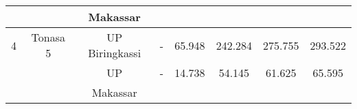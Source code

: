 \documentclass{article}
\begin{document}
\begin{table}[h]
\begin{tabular}{|r|c|c|c|c|c|c|c|}
		\hline
		\multicolumn{ 1}{|r|}{} & \multicolumn{ 1}{|c|}{} &   Makassar & \multicolumn{ 1}{|c|}{} & \multicolumn{ 1}{|c|}{} & \multicolumn{ 1}{|c|}{} & \multicolumn{ 1}{|c|}{} & \multicolumn{ 1}{|c|}{} \\
		\hline
		\multicolumn{ 1}{|r|}{4} & \multicolumn{ 1}{|c|}{Tonasa 5} & UP Biringkassi &          - &     65.948 &    242.284 &    275.755 &    293.522 \\
		\hline
		\multicolumn{ 1}{|r|}{} & \multicolumn{ 1}{|c|}{} &        UP  & \multicolumn{ 1}{|c|}{-} & \multicolumn{ 1}{|c|}{14.738} & \multicolumn{ 1}{|c|}{54.145} & \multicolumn{ 1}{|c|}{61.625} & \multicolumn{ 1}{|c|}{65.595} \\
		\hline
		\multicolumn{ 1}{|r|}{} & \multicolumn{ 1}{|c|}{} &   Makassar & \multicolumn{ 1}{|c|}{} & \multicolumn{ 1}{|c|}{} & \multicolumn{ 1}{|c|}{} & \multicolumn{ 1}{|c|}{} & \multicolumn{ 1}{|c|}{} \\
		\hline
	\end{tabular}  
\end{table}
\end{document}
